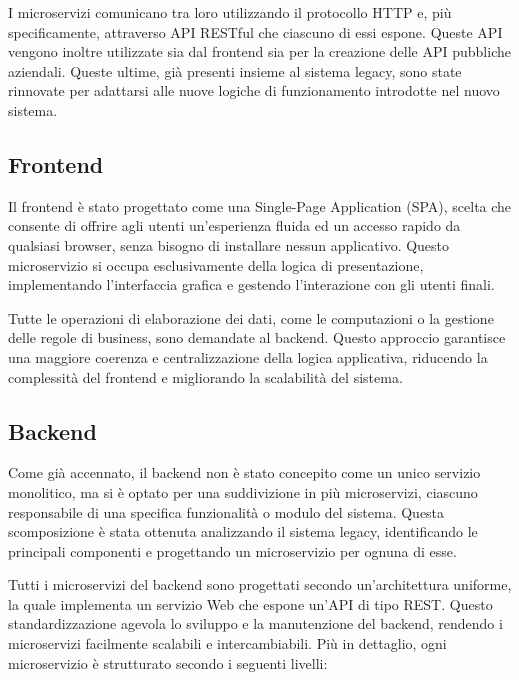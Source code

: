 I microservizi comunicano tra loro utilizzando il protocollo HTTP e, più specificamente, attraverso API RESTful che ciascuno di essi espone. Queste API vengono inoltre utilizzate sia dal frontend sia per la creazione delle API pubbliche aziendali. Queste ultime, già presenti insieme al sistema legacy, sono state rinnovate per adattarsi alle nuove logiche di funzionamento introdotte nel nuovo sistema.

\subsection{Frontend}
Il frontend è stato progettato come una Single-Page Application (SPA), scelta che consente di offrire agli utenti un'esperienza fluida ed un accesso rapido da qualsiasi browser, senza bisogno di installare nessun applicativo. Questo microservizio si occupa esclusivamente della logica di presentazione, implementando l'interfaccia grafica e gestendo l'interazione con gli utenti finali.

Tutte le operazioni di elaborazione dei dati, come le computazioni o la gestione delle regole di business, sono demandate al backend. Questo approccio garantisce una maggiore coerenza e centralizzazione della logica applicativa, riducendo la complessità del frontend e migliorando la scalabilità del sistema.

\subsection{Backend}
Come già accennato, il backend non è stato concepito come un unico servizio monolitico, ma si è optato per una suddivizione in più microservizi, ciascuno responsabile di una specifica funzionalità o modulo del sistema. Questa scomposizione è stata ottenuta analizzando il sistema legacy, identificando le principali componenti e progettando un microservizio per ognuna di esse.

Tutti i microservizi del backend sono progettati secondo un'architettura uniforme, la quale implementa un servizio Web che espone un'API di tipo REST. Questo standardizzazione agevola lo sviluppo e la manutenzione del backend, rendendo i microservizi facilmente scalabili e intercambiabili. Più in dettaglio, ogni microservizio è strutturato secondo i seguenti livelli:

